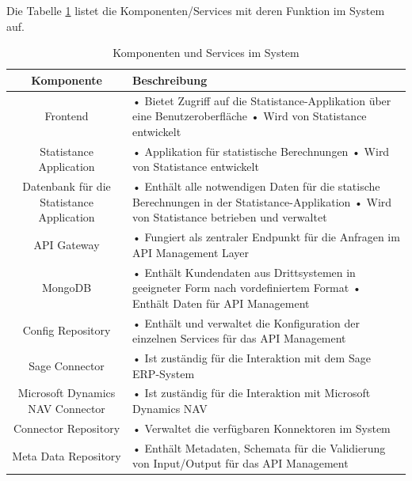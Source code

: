 Die Tabelle \ref{tab:Komponenten und Services im System} listet die Komponenten/Services mit deren Funktion im System auf.

\begin{table}[h!]
\begin{tabular}{|c|p{10cm} |}
\hline
\textbf{Komponente} & \textbf{Beschreibung}\\ \hline \bottomrule
Frontend & • Bietet Zugriff auf die Statistance-Applikation über eine Benutzeroberfläche \newline
•	Wird von Statistance entwickelt \\ \hline
Statistance Application & •	Applikation für statistische Berechnungen \newline
•	Wird von Statistance entwickelt  \\ \hline
Datenbank für die Statistance Application & •	Enthält alle notwendigen Daten für die statische Berechnungen in der Statistance-Applikation \newline
•	Wird von Statistance betrieben und verwaltet \\ \hline
API Gateway & •	Fungiert als zentraler Endpunkt für die Anfragen im API Management Layer \\ \hline
MongoDB & •	Enthält Kundendaten aus Drittsystemen in geeigneter Form nach vordefiniertem Format \newline •	Enthält Daten für API Management \\ \hline
Config Repository & •	Enthält und verwaltet die Konfiguration der einzelnen Services für das API Management \\ \hline
Sage Connector & •	Ist zuständig für die Interaktion mit dem Sage ERP-System \\ \hline
Microsoft Dynamics NAV Connector & •	Ist zuständig für die Interaktion mit Microsoft Dynamics NAV \\ \hline
Connector Repository & •	Verwaltet die verfügbaren Konnektoren im System \\ \hline
Meta Data Repository & •	Enthält Metadaten, Schemata für die Validierung von Input/Output für das API Management \\ \hline
\end{tabular}
\caption{Komponenten und Services im System}
\label{tab:Komponenten und Services im System}
\end{table}

